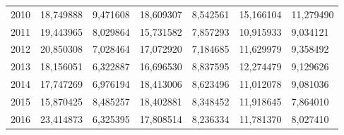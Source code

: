 \begin{table}
\begin{tabular}{p{1cm}p{2cm}p{2cm}p{2cm}p{2cm}p{2cm}p{2cm}}
 2010 &                           18,749888 &     9,471608 &         18,609307 &                           8,542561 &                      15,166104 &                           11,279490 \\
 2011 &                           19,443965 &     8,029864 &         15,731582 &                           7,857293 &                      10,915933 &                            9,034121 \\
 2012 &                           20,850308 &     7,028464 &         17,072920 &                           7,184685 &                      11,629979 &                            9,358492 \\
 2013 &                           18,156051 &     6,322887 &         16,696530 &                           8,837595 &                      12,274479 &                            9,129626 \\
 2014 &                           17,747269 &     6,976194 &         18,413006 &                           8,623496 &                      11,012078 &                            9,081036 \\
 2015 &                           15,870425 &     8,485257 &         18,402881 &                           8,348452 &                      11,918645 &                            7,864010 \\
 2016 &                           23,414873 &     6,325395 &         17,808514 &                           8,236334 &                      11,781370 &                            8,027410 \\
\bottomrule
\end{tabular}
\end{table}
